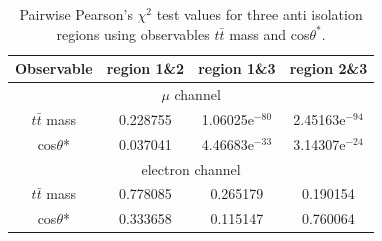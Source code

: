 \begin{table}[ht]
\caption{Pairwise Pearson's $\chi^{2}$ test values for three anti isolation regions using observables $t\bar{t}$ mass and cos$\theta^{*}$.}
\centering
\begin{tabular}{c c c c}
\hline\hline
 Observable & region 1\&2 & region 1\&3 & region 2\&3\\ [0.5ex]
\hline\hline
 \multicolumn{4}{c}{$\mu$ channel}\\ \hline
$t\bar{t}$ mass & 0.228755 & 1.06025e$^{-80}$ & 2.45163e$^{-94}$ \\
cos$\theta$* & 0.037041 &  4.46683e$^{-33}$& 3.14307e$^{-24}$ \\
\hline
\multicolumn{4}{c}{electron channel}\\ \hline
$t\bar{t}$ mass & 0.778085 & 0.265179 & 0.190154 \\
cos$\theta$* & 0.333658 & 0.115147 & 0.760064\\
\hline
\end{tabular}
\label{table:ch2_results}
\end{table}
